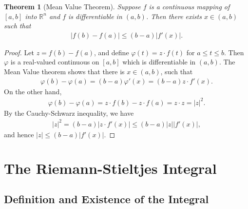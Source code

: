 \documentclass[10pt]{book}
\newtheorem{theorem}{Theorem}[chapter]
\theoremstyle{definition}
\numberwithin{equation}{chapter}
\begin{document}
\medskip

\begin{theorem}[Mean Value Theorem]\label{th_414}
Suppose $f$ is a continuous mapping of $[a,b]$ into $\mathbb{R}^n$ and $f$ is differentiable in $(a,b)$. Then there exists $x \in (a,b)$ such that
\begin{align*}
    \left|f(b) - f(a)\right| \leq (b - a) \left|f'(x)\right|.
\end{align*}
\end{theorem}
\begin{proof}
Let $z = f(b) - f(a)$, and define $\varphi(t) = z \cdot f(t)$ for $a \leq t \leq b$. Then $\varphi$ is a real-valued continuous on $[a,b]$ which is differentiable in $(a,b)$. The Mean Value theorem shows that there is $x \in (a,b)$, such that
\begin{align*}
    \varphi(b) - \varphi(a) = (b - a) \varphi'(x) = (b - a) z \cdot f'(x).
\end{align*}
On the other hand,
\begin{align*}
    \varphi(b) - \varphi(a) = z \cdot f(b) - z \cdot f(a) = z \cdot z = \left|z\right|^2.
\end{align*}
By the Cauchy-Schwarz inequality, we have
\begin{align*}
    \left|z\right|^2 = (b - a)  \left|z \cdot f'(x)\right| \leq (b - a) \left|z\right| \left|f'(x)\right|,
\end{align*}
and hence $\left|z\right| \leq (b - a) \left|f'(x)\right|$.
\end{proof}







\chapter{The Riemann-Stieltjes Integral}

\section{Definition and Existence of the Integral}
\end{document}
